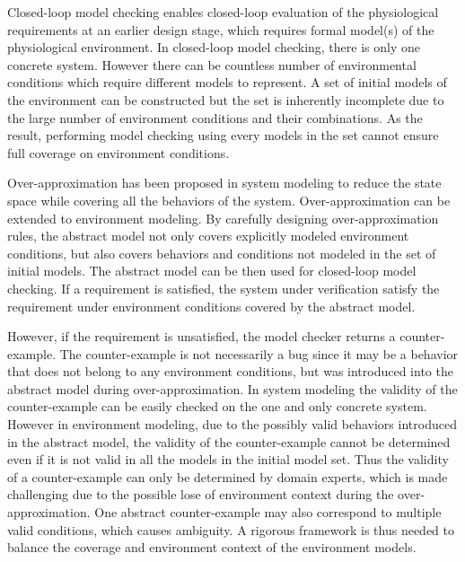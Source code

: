 Closed-loop model checking enables closed-loop evaluation of the physiological requirements at an earlier design stage, which requires formal model(s) of the physiological environment. 
In closed-loop model checking, there is only one concrete system. However there can be countless number of environmental conditions which require different models to represent. A set of initial models of the environment can be constructed but the set is inherently incomplete due to the large number of environment conditions and their combinations. As the result, performing model checking using every models in the set cannot ensure full coverage on environment conditions. 

Over-approximation has been proposed in system modeling to reduce the state space while covering all the behaviors of the system. Over-approximation can be extended to environment modeling. By carefully designing over-approximation rules, the abstract model not only covers explicitly modeled environment conditions, but also covers behaviors and conditions not modeled in the set of initial models. The abstract model can be then used for closed-loop model checking. If a requirement is satisfied, the system under verification satisfy the requirement under environment conditions covered by the abstract model. 

However, if the requirement is unsatisfied, the model checker returns a counter-example. The counter-example is not necessarily a bug since it may be a behavior that does not belong to any environment conditions, but was introduced into the abstract model during over-approximation. In system modeling the validity of the counter-example can be easily checked on the one and only concrete system. However in environment modeling, due to the possibly valid behaviors introduced in the abstract model, the validity of the counter-example cannot be determined even if it is not valid in all the models in the initial model set. Thus the validity of a counter-example can only be determined by domain experts, which is made challenging due to the possible lose of environment context during the over-approximation. One abstract counter-example may also correspond to multiple valid conditions, which causes ambiguity. A rigorous framework is thus needed to balance the coverage and environment context of the environment models.

